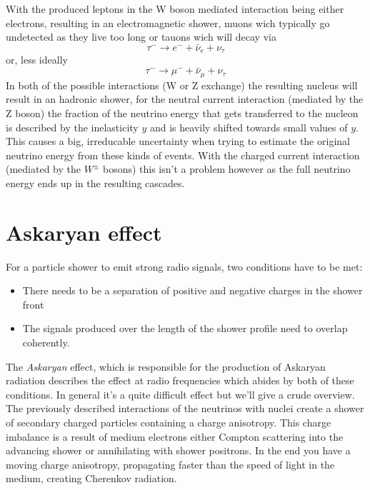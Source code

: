 \documentclass[11pt,a4paper,faculty=we,language=en,doctype=report]{cls/ugent-doc}
\begin{document}
With the produced leptons in the W boson mediated interaction being either electrons,
resulting in an electromagnetic shower, muons wich typically go undetected as they live
too long or
tauons wich will decay via
\begin{equation}
	\tau^- \rightarrow e^- + \bar{\nu}_e + \nu_\tau
\end{equation}
or, less ideally
\begin{equation}
	\tau^- \rightarrow \mu^- + \bar{\nu}_\mu + \nu_\tau
\end{equation}
In both of the possible interactions (W or Z exchange) the resulting nucleus
will result in an hadronic shower, for the neutral current interaction (mediated
by the Z boson) the fraction of the neutrino energy that gets transferred to
the nucleon is described by the inelasticity $y$ and is heavily shifted towards
small values of $y$\cite{elasticity_y}. This causes a big, irreducable
uncertainty when trying to estimate the original neutrino energy from these
kinds of events.  With the charged current interaction (mediated by the $W^\pm$
bosons) this isn't a problem however as the full neutrino energy ends up in the
resulting cascades.
\section{Askaryan effect}
\label{sec:Askaryan}
For a particle shower to emit strong radio signals, two conditions have to be met:
\begin{itemize}
	\item There needs to be a separation of positive and negative charges in the shower front 
	\item The signals produced over the length of the shower profile need to overlap coherently.
\end{itemize}
The \textit{Askaryan} \cite{Askaryan} effect, which is responsible for the
production of Askaryan radiation describes the effect at radio frequencies
which abides by both of these conditions.  In general it's a quite difficult
effect but we'll give a crude overview.  The previously described interactions
of the neutrinos with nuclei create a shower of secondary charged particles
containing a charge anisotropy.  This charge imbalance is a result of medium
electrons either Compton scattering into the advancing shower or annihilating
with shower positrons.  In the end you have a moving charge anisotropy,
propagating faster than the speed of light in the medium, creating Cherenkov
radiation.  
\end{document}
